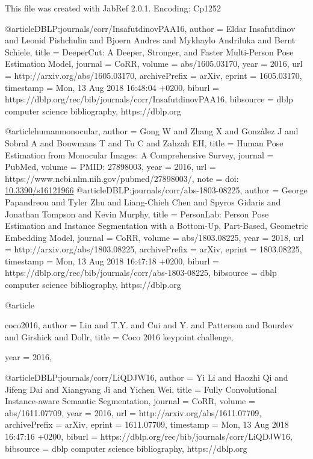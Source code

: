 This file was created with JabRef 2.0.1.
Encoding: Cp1252

@article{DBLP:journals/corr/InsafutdinovPAA16,
  author    = {Eldar Insafutdinov and
               Leonid Pishchulin and
               Bjoern Andres and
               Mykhaylo Andriluka and
               Bernt Schiele},
  title     = {DeeperCut: {A} Deeper, Stronger, and Faster Multi-Person Pose Estimation
               Model},
  journal   = {CoRR},
  volume    = {abs/1605.03170},
  year      = {2016},
  url       = {http://arxiv.org/abs/1605.03170},
  archivePrefix = {arXiv},
  eprint    = {1605.03170},
  timestamp = {Mon, 13 Aug 2018 16:48:04 +0200},
  biburl    = {https://dblp.org/rec/bib/journals/corr/InsafutdinovPAA16},
  bibsource = {dblp computer science bibliography, https://dblp.org}
}

@article{humanmonocular,
  author    = {Gong W and
               Zhang X and
               Gonzàlez J and
               Sobral A and
               Bouwmans T and
               Tu C and
               Zahzah EH},
  title     = {Human Pose Estimation from Monocular Images: A Comprehensive Survey},
  journal   = {PubMed},
  volume    = {PMID: 27898003},
  year      = {2016},
  url       = {https://www.ncbi.nlm.nih.gov/pubmed/27898003/},
    note     = {doi: \url{10.3390/s16121966}}
}
@article{DBLP:journals/corr/abs-1803-08225,
  author    = {George Papandreou and
               Tyler Zhu and
               Liang{-}Chieh Chen and
               Spyros Gidaris and
               Jonathan Tompson and
               Kevin Murphy},
  title     = {PersonLab: Person Pose Estimation and Instance Segmentation with a
               Bottom-Up, Part-Based, Geometric Embedding Model},
  journal   = {CoRR},
  volume    = {abs/1803.08225},
  year      = {2018},
  url       = {http://arxiv.org/abs/1803.08225},
  archivePrefix = {arXiv},
  eprint    = {1803.08225},
  timestamp = {Mon, 13 Aug 2018 16:47:18 +0200},
  biburl    = {https://dblp.org/rec/bib/journals/corr/abs-1803-08225},
  bibsource = {dblp computer science bibliography, https://dblp.org}
}

@article{coco2016,
  author    = {Lin and
               T.Y. and
               Cui and
               Y. and
               Patterson and
               Bourdev and
               Girshick and
               Dollr},
  title     = {Coco 2016 keypoint challenge},

  year      = {2016},

}
@article{DBLP:journals/corr/LiQDJW16,
  author    = {Yi Li and
               Haozhi Qi and
               Jifeng Dai and
               Xiangyang Ji and
               Yichen Wei},
  title     = {Fully Convolutional Instance-aware Semantic Segmentation},
  journal   = {CoRR},
  volume    = {abs/1611.07709},
  year      = {2016},
  url       = {http://arxiv.org/abs/1611.07709},
  archivePrefix = {arXiv},
  eprint    = {1611.07709},
  timestamp = {Mon, 13 Aug 2018 16:47:16 +0200},
  biburl    = {https://dblp.org/rec/bib/journals/corr/LiQDJW16},
  bibsource = {dblp computer science bibliography, https://dblp.org}
}

